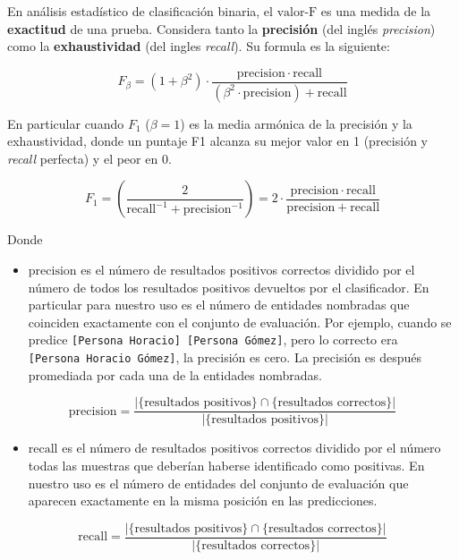 \documentclass[12pt,a4paper,]{scrartcl}
\providecommand{\tightlist}{%
  \setlength{\itemsep}{0pt}\setlength{\parskip}{0pt}}
\begin{document}
En análisis estadístico de clasificación binaria, el \(\text{valor-F}\) es una medida de la \textbf{exactitud} de una prueba.
Considera tanto la \textbf{precisión} (del inglés \emph{precision}) como la \textbf{exhaustividad} (del ingles \emph{recall}). Su formula es la siguiente:

\[
F_\beta = (1 + \beta^2) \cdot \frac{\mathrm{precision} \cdot \mathrm{recall}}{(\beta^2 \cdot \mathrm{precision}) + \mathrm{recall}}
\]

En particular cuando \(F_1\) (\(\beta = 1\)) es la media armónica de la precisión y la exhaustividad, donde un puntaje F1 alcanza su mejor valor en 1 (precisión y \emph{recall} perfecta) y el peor en 0.

\[
F_1 = \left(\frac{2}{\mathrm{recall}^{-1} + \mathrm{precision}^{-1}}\right) = 2 \cdot \frac{\mathrm{precision} \cdot \mathrm{recall}}{\mathrm{precision} + \mathrm{recall}}
\]

Donde

\begin{itemize}
\tightlist
\item
  \(\text{precision}\) es el número de resultados positivos correctos dividido por el número de todos los resultados positivos devueltos por el clasificador.
  En particular para nuestro uso es el número de entidades nombradas que coinciden exactamente con el conjunto de evaluación.
  Por ejemplo, cuando se predice \texttt{{[}Persona\ Horacio{]}\ {[}Persona\ Gómez{]}}, pero lo correcto era \texttt{{[}Persona\ Horacio\ Gómez{]}}, la precisión es cero. La precisión es después promediada por cada una de la entidades nombradas.
\end{itemize}

\[
\text{precision}=\frac{|\{\text{resultados positivos}\}\cap\{\text{resultados correctos}\}|}{|\{\text{resultados positivos}\}|}
\]

\begin{itemize}
\tightlist
\item
  \(\text{recall}\) es el número de resultados positivos correctos dividido por el número todas las muestras que deberían haberse identificado como positivas.
  En nuestro uso es el número de entidades del conjunto de evaluación que aparecen exactamente en la misma posición en las predicciones.
\end{itemize}

\[
\text{recall}=\frac{|\{\text{resultados positivos}\}\cap\{\text{resultados correctos}\}|}{|\{\text{resultados correctos}\}|}
\]
\end{document}
